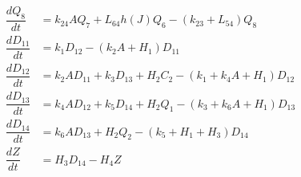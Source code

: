 \begin{align*}
\dfrac{dQ_{8}}{dt} & =k_{24}AQ_{7}+L_{64}h\left(J\right)Q_{6}-\left(k_{23}+L_{54}\right)Q_{8}\\
\dfrac{dD_{11}}{dt} & =k_{1}D_{12}-\left(k_{2}A+H_{1}\right)D_{11}\\
\dfrac{dD_{12}}{dt} & =k_{2}AD_{11}+k_{3}D_{13}+H_{2}C_{2}-\left(k_{1}+k_{4}A+H_{1}\right)D_{12}\\
\dfrac{dD_{13}}{dt} & =k_{4}AD_{12}+k_{5}D_{14}+H_{2}Q_{1}-\left(k_{3}+k_{6}A+H_{1}\right)D_{13}\\
\dfrac{dD_{14}}{dt} & =k_{6}AD_{13}+H_{2}Q_{2}-\left(k_{5}+H_{1}+H_{3}\right)D_{14}\\
\dfrac{dZ}{dt} & =H_{3}D_{14}-H_{4}Z
\end{align*}
